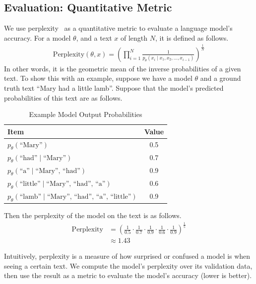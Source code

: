 \documentclass[../main.tex]{subfiles}
\begin{document}
\subsection{Evaluation: Quantitative Metric}
We use perplexity~\cite{jelinekPerplexityMeasureDifficulty1977} as a quantitative metric to evaluate a language model's accuracy. For a model $\theta$, and a text $x$ of length $N$, it is defined as follows.
\begin{align}
    \text{Perplexity}(\theta, x) = \left( \prod_{i=1}^N \frac{1}{p_\theta(x_i\mid x_1, x_2, \dots, x_{i-1})} \right)^{\frac1N}
\end{align}
In other words, it is the geometric mean of the inverse probabilities of a given text. To show this with an example, suppose we have a model $\theta$ and a ground truth text ``Mary had a little lamb''. Suppose that the model's predicted probabilities of this text are as follows.

\begin{table}[H]
\centering
\caption{Example Model Output Probabilities}
\begin{tabular}{|l|c|}
    \hline
    Item & Value \\ \hline
    $p_\theta(\text{``Mary''})$ & 0.5 \\ \hline
    $p_\theta(\text{``had''}\mid\text{``Mary''})$ & 0.7 \\ \hline
    $p_\theta(\text{``a''}\mid\text{``Mary'', ``had''})$ & 0.9 \\ \hline
    $p_\theta(\text{``little''}\mid\text{``Mary'', ``had'', ``a''})$ & 0.6 \\ \hline
    $p_\theta(\text{``lamb''}\mid\text{``Mary'', ``had'', ``a'', ``little''})$ & 0.9 \\ \hline
\end{tabular}
\end{table}

Then the perplexity of the model on the text is as follows.
\begin{align}
    \text{Perplexity} &= \left(\frac{1}{0.5}\cdot\frac{1}{0.7}\cdot\frac{1}{0.9}\cdot\frac{1}{0.6}\cdot\frac{1}{0.9}\right)^{\frac15} \\
    &\approx 1.43
\end{align}

Intuitively, perplexity is a measure of how surprised or confused a model is when seeing a certain text. We compute the model's perplexity over its validation data, then use the result as a metric to evaluate the model's accuracy (lower is better).
\end{document}
